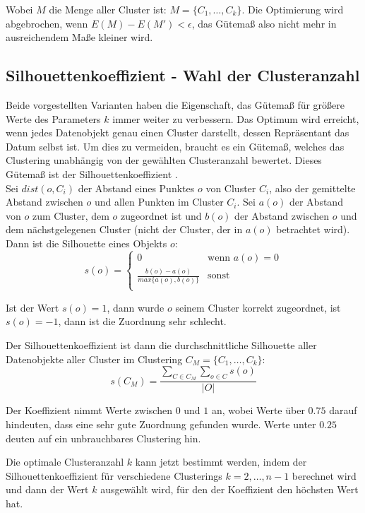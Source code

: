 \documentclass[11pt,ceqn]{book}
\begin{document}
Wobei $M$ die Menge aller Cluster ist: $M = \{C_1, \dots, C_k\}$. Die Optimierung wird abgebrochen, wenn $E(M)-E(M')<\epsilon$, das Gütemaß also nicht mehr in ausreichendem Maße kleiner wird.

\subsection{Silhouettenkoeffizient - Wahl der Clusteranzahl}
Beide vorgestellten Varianten haben die Eigenschaft, das Gütemaß für größere Werte des Parameters $k$ immer weiter zu verbessern. Das Optimum wird erreicht, wenn jedes Datenobjekt genau einen Cluster darstellt, dessen Repräsentant das Datum selbst ist. Um dies zu vermeiden, braucht es ein Gütemaß, welches das Clustering unabhängig von der gewählten Clusteranzahl bewertet. Dieses Gütemaß ist der Silhouettenkoeffizient \cite{silh}.\\
Sei $dist(o,C_i)$ der Abstand eines Punktes $o$ von Cluster $C_i$, also der gemittelte Abstand zwischen $o$ und allen Punkten im Cluster $C_i$. Sei $a(o)$ der Abstand von $o$ zum Cluster, dem $o$ zugeordnet ist und $b(o)$ der Abstand zwischen $o$ und dem nächstgelegenen Cluster (nicht der Cluster, der in $a(o)$ betrachtet wird).
Dann ist die Silhouette eines Objekts $o$:
\begin{equation}
   s(o) =
   \begin{cases}
     0 & \text{wenn } a(o) = 0\\
     \frac{b(o) - a(o)}{max\{a(o), b(o)\}} & \text{sonst} \\
   \end{cases}
\end{equation}

Ist der Wert $s(o) = 1$, dann wurde $o$ seinem Cluster korrekt zugeordnet, ist $s(o) = -1$, dann ist die Zuordnung sehr schlecht.

Der Silhouettenkoeffizient ist dann die durchschnittliche Silhouette aller Datenobjekte aller Cluster im Clustering $C_M = \{C_1, \dots, C_k\}$:
$$s(C_M) = \frac{\sum\limits_{C \in C_M} \sum\limits_{o \in C} s(o)} {|O|}$$

Der Koeffizient nimmt Werte zwischen $0$ und $1$ an, wobei Werte über $0.75$ darauf hindeuten, dass eine sehr gute Zuordnung gefunden wurde. Werte unter $0.25$ deuten auf ein unbrauchbares Clustering hin.

Die optimale Clusteranzahl $k$ kann jetzt bestimmt werden, indem der Silhouettenkoeffizient für verschiedene Clusterings $k = 2, \dots, n-1$ berechnet wird und dann der Wert $k$ ausgewählt wird, für den der Koeffizient den höchsten Wert hat.
\end{document}
